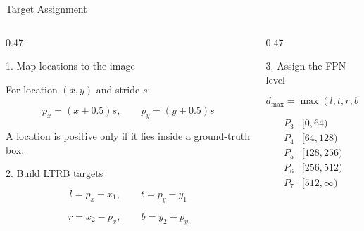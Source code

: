 \documentclass[aspectratio=169,11pt]{beamer}
\begin{document}




\begin{frame}{Target Assignment}

\begin{columns}[t]

\begin{column}{0.47\textwidth}

\begin{block}{1. Map locations to the image}
\footnotesize

For location $(x,y)$ and stride $s$:

\[
p_x=(x+0.5)s,
\qquad
p_y=(y+0.5)s
\]

A location is positive only if it lies
inside a ground-truth box.

\end{block}

\vspace{0.12cm}

\begin{block}{2. Build LTRB targets}
\footnotesize

\[
l=p_x-x_1,\qquad t=p_y-y_1
\]

\[
r=x_2-p_x,\qquad b=y_2-p_y
\]

\end{block}

\end{column}

\begin{column}{0.47\textwidth}

\begin{block}{3. Assign the FPN level}
\footnotesize

\[
d_{\max}=\max(l,t,r,b)
\]

\[
\begin{array}{c|c}
P_3 &[0,64)\\
P_4 &[64,128)\\
P_5 &[128,256)\\
P_6 &[256,512)\\
P_7 &[512,\infty)
\end{array}
\]

\end{block}


\end{column}
\end{columns}
\end{frame}
\end{document}
